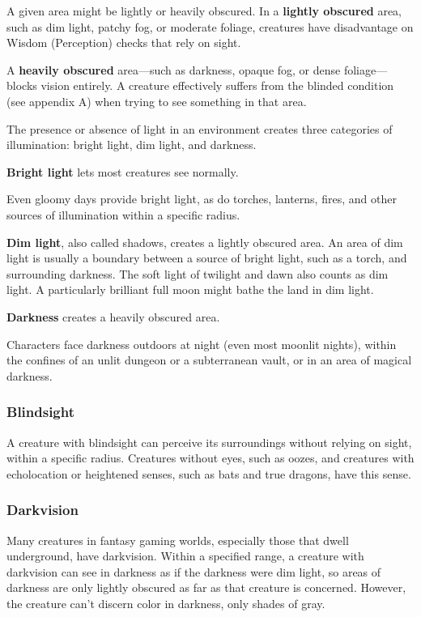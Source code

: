 A given area might be lightly or heavily obscured. In a \textbf{lightly obscured} area, such as dim light, patchy fog, or moderate foliage, creatures have disadvantage on Wisdom (Perception) checks that rely on sight.

A \textbf{heavily obscured} area—such as darkness, opaque fog, or dense foliage—blocks vision entirely. A creature effectively suffers from the blinded condition (see appendix A) when trying to see something in that area.

The presence or absence of light in an environment creates three categories of illumination: bright light, dim light, and darkness.

\textbf{Bright light} lets most creatures see normally.

Even gloomy days provide bright light, as do torches, lanterns, fires, and other sources of illumination within a specific radius.

\textbf{Dim light}, also called shadows, creates a lightly obscured area. An area of dim light is usually a boundary between a source of bright light, such as a torch, and surrounding darkness. The soft light of twilight and dawn also counts as dim light. A particularly brilliant full moon might bathe the land in dim light.

\textbf{Darkness} creates a heavily obscured area.

Characters face darkness outdoors at night (even most moonlit nights), within the confines of an unlit dungeon or a subterranean vault, or in an area of magical darkness.

\subsubsection{Blindsight}

A creature with blindsight can perceive its surroundings without relying on sight, within a specific radius. Creatures without eyes, such as oozes, and creatures with echolocation or heightened senses, such as bats and true dragons, have this sense.

\subsubsection{Darkvision}

Many creatures in fantasy gaming worlds, especially those that dwell underground, have darkvision. Within a specified range, a creature with darkvision can see in darkness as if the darkness were dim light, so areas of darkness are only lightly obscured as far as that creature is concerned. However, the creature can't discern color in darkness, only shades of gray.

